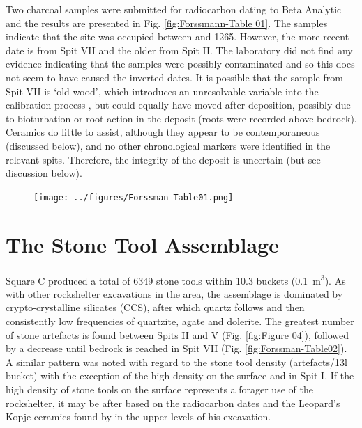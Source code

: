Two charcoal samples were submitted for radiocarbon dating to Beta Analytic and the results are presented in Fig. \ref{fig:Forssmann-Table 01}. The samples indicate that the site was occupied between  and 1265. However, the more recent date is from Spit VII and the older from Spit II. The laboratory did not find any evidence indicating that the samples were possibly contaminated and so this does not seem to have caused the inverted dates. It is possible that the sample from Spit VII is ‘old wood’, which introduces an unresolvable variable into the calibration process \parencite{Kennett_2002}, but could equally have moved after deposition, possibly due to bioturbation \parencite[see][]{Lancaster_2003} or root action in the deposit (roots were recorded above bedrock). Ceramics do little to assist, although they appear to be contemporaneous (discussed below), and no other chronological markers were identified in the relevant spits. Therefore, the integrity of the deposit is uncertain (but see discussion below).

	\begin{figure} %
		\texttt{[image: ../figures/Forssman-Table01.png]}
		\label{fig:Forssmann-Table01}
	\end{figure}

\section{The Stone Tool Assemblage}

Square C produced a total of \num{6349} stone tools within 10.3 buckets (\SI{0.1}{\meter\cubed}). 
As with other rockshelter excavations in the area, the assemblage is dominated by crypto-crystalline silicates (CCS), after which quartz follows and then consistently low frequencies of quartzite, agate and dolerite. The greatest number of stone artefacts is found between Spits II and V (Fig. \ref{fig:Figure 04}), 
followed by a decrease until bedrock is reached in Spit VII (Fig. \ref{fig:Forssman-Table02}). 
A similar pattern was noted with regard to the stone tool density (artefacts/13l bucket) with the exception of the high density on the surface and in Spit I. If the high density of stone tools on the surface represents a forager use of the rockshelter, it may be after  based on the radiocarbon dates and the Leopard’s Kopje ceramics found by \textcite{Walker_1994} in the upper levels of his excavation. 

